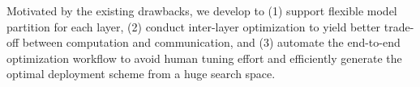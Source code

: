 




Motivated by the existing drawbacks, we develop \sysname to (1) support flexible model partition for each layer, (2) conduct inter-layer optimization to yield better trade-off  between computation and communication, and (3) automate the end-to-end optimization workflow to avoid human tuning effort and efficiently generate the optimal deployment scheme from a huge search space.





